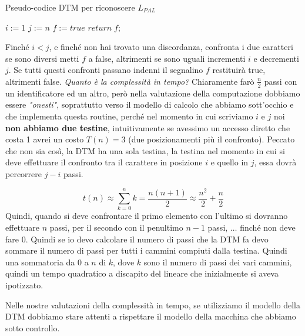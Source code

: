 \documentclass{article}
\begin{document}
\begin{algorithm}[hbt!]
    \caption{Pseudo-codice DTM per riconoscere $L_{PAL}$}\label{alg:pal}
    $i:=1$\;
    $j:=n$\;
    $f:=true$\;
    $return\;f;$
\end{algorithm}
Finché $i<j$, e finché non hai trovato una discordanza, confronta i due caratteri
se sono diversi metti $f$ a false, altrimenti se sono uguali incrementi $i$ e decrementi
$j$. Se tutti questi confronti passano indenni il segnalino $f$ restituirà true,
altrimenti false. \textit{Quanto è la complessità in tempo?} Chiaramente
farò $\frac{n}{2}$ passi con un identificatore ed un altro, però nella valutazione
della computazione dobbiamo essere \textit{"onesti"}, soprattutto verso il
modello di calcolo che abbiamo sott'occhio e che implementa questa routine, perché
nel momento in cui scriviamo $i$ e $j$ noi \textbf{non abbiamo due testine}, intuitivamente
se avessimo un accesso diretto che costa 1 avrei un costo $T(n)=3$ (due posizionamenti più il confronto).
\newline\newline
Peccato che non sia così, la DTM ha una
sola testina, la testina nel momento in cui si deve effettuare il confronto
tra il carattere in posizione $i$ e quello in $j$, essa dovrà percorrere
$j-i$ passi.

$$t(n)\approx\sum_{k=0}^{n}k=\frac{n(n+1)}{2}\approx\frac{n^2}{2}+\frac{n}{2}$$
Quindi, quando si deve confrontare il primo elemento con l'ultimo si dovranno
effettuare $n$ passi, per il secondo con il penultimo $n-1$ passi, $\dots$
finché non deve fare 0. Quindi se io devo calcolare il numero di passi che
la DTM fa devo sommare il numero di passi per tutti i cammini compiuti
dalla testina. Quindi una sommatoria da 0 a $n$ di $k$, dove $k$ sono il numero
di passi dei vari cammini, quindi un tempo quadratico a discapito del lineare
che inizialmente si aveva ipotizzato.\newline\newline

Nelle nostre valutazioni della complessità in tempo, se utilizziamo il modello
della DTM dobbiamo stare attenti a rispettare il modello della macchina
che abbiamo sotto controllo.
\end{document}
